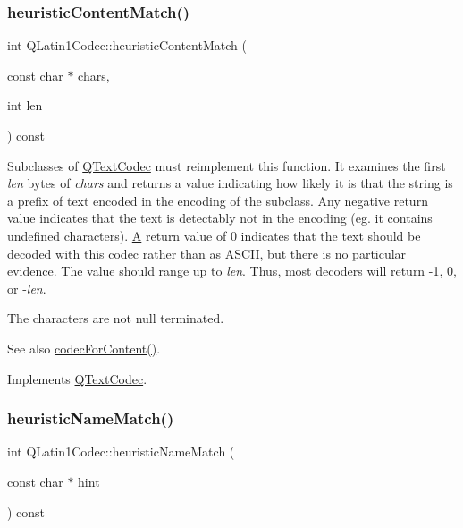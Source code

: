 \mbox{\label{class_q_latin1_codec_a6d2af26fea72aee95f3f07049deeb72c}} 
\subsubsection{\texorpdfstring{heuristicContentMatch()}{heuristicContentMatch()}}
{\footnotesize\ttfamily int Q\+Latin1\+Codec\+::heuristic\+Content\+Match (\begin{DoxyParamCaption}\item[{const char $\ast$}]{chars,  }\item[{int}]{len }\end{DoxyParamCaption}) const\hspace{0.3cm}{\ttfamily [virtual]}}

Subclasses of \mbox{\hyperlink{class_q_text_codec}{Q\+Text\+Codec}} must reimplement this function. It examines the first {\itshape len} bytes of {\itshape chars} and returns a value indicating how likely it is that the string is a prefix of text encoded in the encoding of the subclass. Any negative return value indicates that the text is detectably not in the encoding (eg. it contains undefined characters). \mbox{\hyperlink{class_a}{A}} return value of 0 indicates that the text should be decoded with this codec rather than as A\+S\+C\+II, but there is no particular evidence. The value should range up to {\itshape len}. Thus, most decoders will return -\/1, 0, or -\/{\itshape len}.

The characters are not null terminated.

\begin{DoxySeeAlso}{See also}
\mbox{\hyperlink{class_q_text_codec_aeb3ec365c6c4f1812689a2b66ed09e27}{codec\+For\+Content()}}. 
\end{DoxySeeAlso}


Implements \mbox{\hyperlink{class_q_text_codec_a4780a608d950994a927de727bb07b9fe}{Q\+Text\+Codec}}.

\mbox{\label{class_q_latin1_codec_a34f0298855e849d6c4bd67a7115971ec}} 
\subsubsection{\texorpdfstring{heuristicNameMatch()}{heuristicNameMatch()}}
{\footnotesize\ttfamily int Q\+Latin1\+Codec\+::heuristic\+Name\+Match (\begin{DoxyParamCaption}\item[{const char $\ast$}]{hint }\end{DoxyParamCaption}) const\hspace{0.3cm}{\ttfamily [virtual]}}


